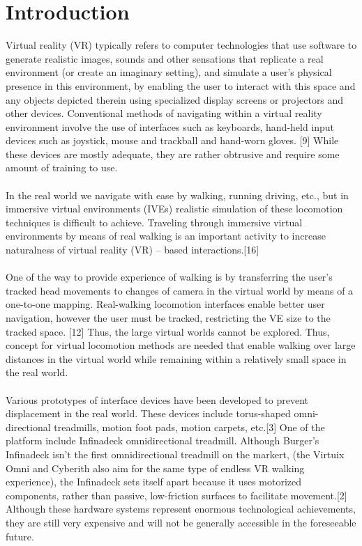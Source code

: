 \documentclass[12pt]{article}
\begin{document}
\section{Introduction}
Virtual reality (VR) typically refers to computer technologies that use software to generate realistic images, sounds and other sensations that replicate a real environment (or create an imaginary setting), and simulate a user's physical presence in this environment, by enabling the user to interact with this space and any objects depicted therein using specialized display screens or projectors and other devices. Conventional methods of navigating within a virtual reality environment involve the use of interfaces such as keyboards, hand-held input devices such as joystick, mouse and trackball and hand-worn gloves. [9] While these devices are mostly adequate, they are rather obtrusive and require some amount of training to use.\\
\\
In the real world we navigate with ease by walking, running driving, etc., but in immersive virtual environments (IVEs) realistic simulation of these locomotion techniques is difficult to achieve. Traveling through immersive virtual environments by means of real walking is an important activity to increase naturalness of virtual reality (VR) – based interactions.[16]\\
\\
One of the way to provide experience of walking is by transferring the user’s tracked head movements to changes of camera in the virtual world by means of a one-to-one mapping. Real-walking locomotion interfaces enable better user navigation, however the user must be tracked, restricting the VE size to the tracked space. [12] Thus, the large virtual worlds cannot be explored. Thus, concept for virtual locomotion methods are needed that enable walking over large distances in the virtual world while remaining within a relatively small space in the real world.\\
\\
Various prototypes of interface devices have been developed to prevent displacement in the real world. These devices include torus-shaped omni-directional treadmills, motion foot pads, motion carpets, etc.[3] One of the platform include Infinadeck omnidirectional treadmill. Although Burger's Infinadeck isn't the first omnidirectional treadmill on the markert, (the Virtuix Omni and Cyberith also aim for the same type of endless VR walking experience),  the Infinadeck sets itself apart because it uses motorized components, rather than passive, low-friction surfaces to facilitate movement.[2] Although these hardware systems represent enormous technological achievements, they are still very expensive and will not be generally accessible in the foreseeable future.\\
\end{document}

